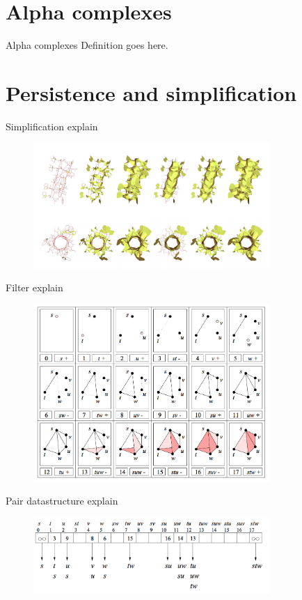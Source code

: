 \documentclass[10pt, compress]{beamer}
\begin{document}
\section{Alpha complexes}
\begin{frame}{Alpha complexes}
    Definition goes here.
\end{frame}
\section{Persistence and simplification}
\begin{frame}{Simplification}
    explain
    \begin{figure}
        \centering
        \includegraphics[width=0.8\textwidth]{fig/simplification.png}
    \end{figure}
\end{frame}
\begin{frame}{Filter}
    explain
    \begin{figure}
        \centering
        \includegraphics[width=0.8\textwidth]{fig/filter.png}
    \end{figure}
\end{frame}
\begin{frame}{Pair datastructure}
    explain
    \begin{figure}
        \centering
        \includegraphics[width=0.8\textwidth]{fig/pairs.png}
    \end{figure}
\end{frame}
\end{document}
